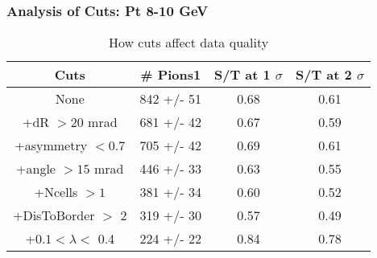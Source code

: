 \frame
{
\frametitle{Analysis of Cuts: Pt  8-10 GeV}
\begin{table}
\caption{How cuts affect data quality}
\centering
\begin{tabular}{c c c c}
\hline\hline
Cuts & \# Pions1 & S/T at 1 $\sigma$ & S/T at 2 $\sigma$ \\ [0.5ex]
\hline
None &  842 +/-   51 & 0.68 & 0.61 \\ %
+dR $> 20$ mrad &  681 +/-   42 & 0.67 & 0.59 \\ %
+asymmetry $< 0.7$ &  705 +/-   42 & 0.69 & 0.61 \\ %
+angle $> 15$ mrad &  446 +/-   33 & 0.63 & 0.55 \\ %
+Ncells $> 1$&  381 +/-   34 & 0.60 & 0.52 \\ %
+DisToBorder $>$ 2 &  319 +/-   30 & 0.57 & 0.49 \\ %
+$0.1 < \lambda <$ 0.4 &  224 +/-   22 & 0.84 & 0.78 \\ %
[1ex]
\hline
\end{tabular}
\label{table:nonlin}
\end{table}
}
